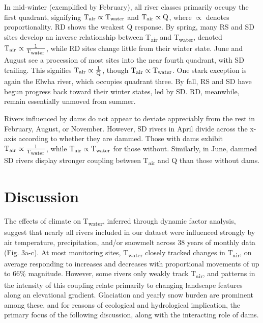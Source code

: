 \documentclass[notitlepage]{article}
\begin{document}
In mid-winter (exemplified by February), all river classes primarily occupy the first quadrant, signifying $\textrm{T}\textsubscript{air} \propto \textrm{T}\textsubscript{water}$ and $\textrm{T}\textsubscript{air} \propto \textrm{Q}$, where $\propto$ denotes proportionality. RD shows the weakest Q response. By spring, many RS and SD sites develop an inverse relationship between T\textsubscript{air} and T\textsubscript{water}, denoted $\textrm{T}\textsubscript{air} \propto \frac{1}{\textrm{T}\textsubscript{water}}$, while RD sites change little from their winter state. June and August see a procession of most sites into the near fourth quadrant, with SD trailing. This signifies $\textrm{T}\textsubscript{air} \propto \frac{1}{\textrm{Q}}$, though $\textrm{T}\textsubscript{air} \propto \textrm{T}\textsubscript{water}$. One stark exception is again the Elwha river, which occupies quadrant three. By fall, RS and SD have begun progress back toward their winter states, led by SD. RD, meanwhile, remain essentially unmoved from summer.

Rivers influenced by dams do not appear to deviate appreciably from the rest in February, August, or November. However, SD rivers in April divide across the x-axis according to whether they are dammed. Those with dams exhibit $\textrm{T}\textsubscript{air} \propto \frac{1}{\textrm{T}\textsubscript{water}}$, while $\textrm{T}\textsubscript{air} \propto \textrm{T}\textsubscript{water}$ for those without. Similarly, in June, dammed SD rivers display stronger coupling between T\textsubscript{air} and Q than those without dams.

\section*{Discussion}

The effects of climate on T\textsubscript{water}, inferred through dynamic factor analysis, suggest that nearly all rivers included in our dataset were influenced strongly by air temperature, precipitation, and/or snowmelt across 38 years of monthly data (Fig. 3a-c). At most monitoring sites, T\textsubscript{water} closely tracked changes in T\textsubscript{air}, on average responding to increases and decreases with proportional movements of up to 66\% magnitude. However, some rivers only weakly track T\textsubscript{air}, and patterns in the intensity of this coupling relate primarily to changing landscape features along an elevational gradient. Glaciation and yearly snow burden are prominent among these, and for reasons of ecological and hydrological implication, the primary focus of the following discussion, along with the interacting role of dams.
\end{document}
